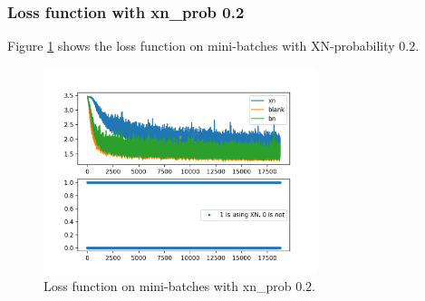 \subsubsection{Loss function with xn\_prob 0.2}
Figure \ref{fig:XN_MNIST_1} shows the loss function on mini-batches with XN-probability $0.2$.
\begin{figure}[H]
	\center
	\includegraphics*[width=8cm]{./figures/XN14.png}
	\caption{Loss function on mini-batches with xn\_prob $0.2$.}
	\label{fig:XN_MNIST_1}
\end{figure}

